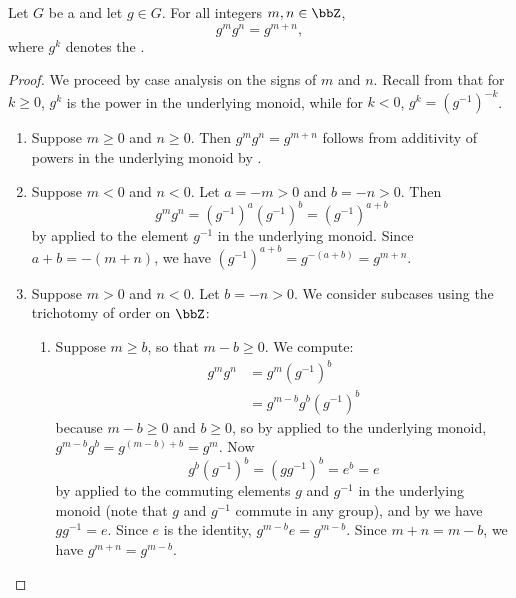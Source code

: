 \begin{lemma} \label{lemma:additivity_of_powers_in_a_group}
    Let $G$ be a  and let $g \in G$. For all integers $m,n \in \bbZ$,
    $$g^m g^n = g^{m+n},$$
    where $g^k$ denotes the .
\end{lemma}
\begin{proof}
    We proceed by case analysis on the signs of $m$ and $n$. Recall from that for $k \geq 0$, $g^k$ is the power in the underlying monoid, while for $k < 0$, $g^k = (g^{-1})^{-k}$.

    \begin{enumerate}
        \item Suppose $m \geq 0$ and $n \geq 0$. Then $g^m g^n = g^{m+n}$ follows from additivity of powers in the underlying monoid by .

        \item Suppose $m < 0$ and $n < 0$. Let $a = -m > 0$ and $b = -n > 0$. Then
        $$g^m g^n = (g^{-1})^a (g^{-1})^b = (g^{-1})^{a+b}$$
        by  applied to the element $g^{-1}$ in the underlying monoid. Since $a + b = -(m+n)$, we have $(g^{-1})^{a+b} = g^{-(a+b)} = g^{m+n}$.

        \item Suppose $m > 0$ and $n < 0$. Let $b = -n > 0$. We consider subcases using the trichotomy of order on $\bbZ$:
            \begin{enumerate}
                \item Suppose $m \geq b$, so that $m - b \geq 0$. We compute:
                \begin{align*}
                    g^m g^n &= g^m (g^{-1})^b \\
                    &= g^{m-b} g^b (g^{-1})^b
                \end{align*}
                because $m - b \ge 0$ and $b \ge 0$, so by  applied to the underlying monoid, $g^{m-b} g^b = g^{(m-b)+b} = g^m$. Now
                $$g^b (g^{-1})^b = (g g^{-1})^b = e^b = e$$
                by  applied to the commuting elements $g$ and $g^{-1}$ in the underlying monoid (note that $g$ and $g^{-1}$ commute in any group), and by  we have $g g^{-1} = e$. Since $e$ is the identity, $g^{m-b} e = g^{m-b}$. Since $m + n = m - b$, we have $g^{m+n} = g^{m-b}$.


\end{enumerate}
\end{enumerate}
\end{proof}
